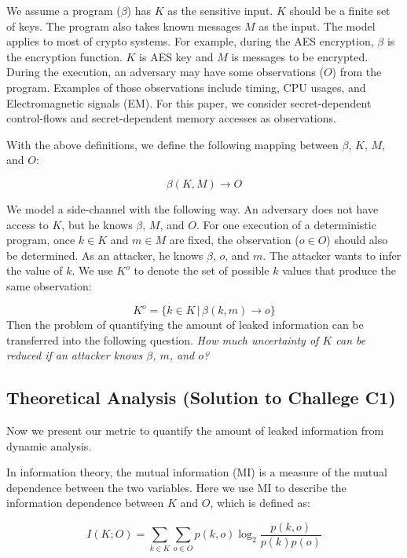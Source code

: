 We assume a program ($\beta$) has $K$ as the sensitive input. $K$ should be a
finite set of keys. The program also takes known messages $M$ as the input. The
model applies to most of crypto systems. For example, during the AES
encryption, $\beta$ is the encryption function. $K$ is AES key and $M$ is 
messages to be encrypted. During the execution, an adversary may have some
observations ($O$) from the program. Examples of those observations include
timing, CPU usages, and Electromagnetic signals (EM). For this paper, we
consider secret-dependent control-flows and secret-dependent memory accesses
as observations.

With the above definitions, we define the following mapping between $\beta$, $K$,
$M$, and $O$:

\begin{displaymath}
    \beta(K, M) \rightarrow O
\end{displaymath}

We model a side-channel with the following way.
An adversary does not have access to $K$, but he knows $\beta$, $M$, and $O$.
For one execution of a deterministic program, once $k \in K$ and $m \in M$ are
fixed, the observation ($o \in O$) should also be determined. As an attacker, he knows
$\beta$, $o$, and $m$. The attacker wants to infer the value of $k$. We use
$K^o$ to denote the set of possible $k$ values that produce the same
observation:

\begin{displaymath}
    K^o = \{ k \in K \, |\, \beta(k, m) \rightarrow o\}
\end{displaymath}
Then the problem of quantifying the amount of leaked information can be
transferred into the following question.
\emph{How much uncertainty of $K$ can be reduced if an attacker knows $\beta$, $m$, and $o$?}

\subsection{Theoretical Analysis \textbf{(Solution to Challege C1)}}
Now we present our metric to quantify the amount of leaked information from
dynamic analysis.

In information theory, the mutual information (MI) is a measure of the mutual
dependence between the two variables. Here we use MI to describe the information 
dependence between $K$ and $O$, which is defined as:

\begin{equation} \label{eq:1}
    I(K;O) = \sum_{k {\in} K}{\sum_{o {\in} O}{p(k, o)\log_2\frac{p(k, o)}{p(k)p(o)}}}
\end{equation}


